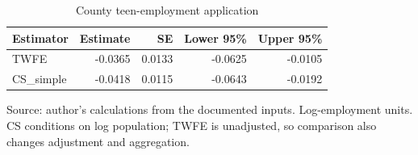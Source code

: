\begin{table}[htbp]
\centering
\small
\caption{County teen-employment application}
\begin{tabularx}{\linewidth}{Xrrrr}
\toprule
Estimator & Estimate & SE & Lower 95\% & Upper 95\% \\
\midrule
TWFE & -0.0365 & 0.0133 & -0.0625 & -0.0105 \\
CS\_\allowbreak{}simple & -0.0418 & 0.0115 & -0.0643 & -0.0192 \\
\bottomrule
\end{tabularx}
\par\vspace{3pt}\begin{minipage}{\linewidth}\footnotesize Source: author's calculations from the documented inputs.\allowbreak{} Log-employment units.\allowbreak{} CS conditions on log population; TWFE is unadjusted, so comparison also changes adjustment and aggregation.\allowbreak{}\end{minipage}
\end{table}
